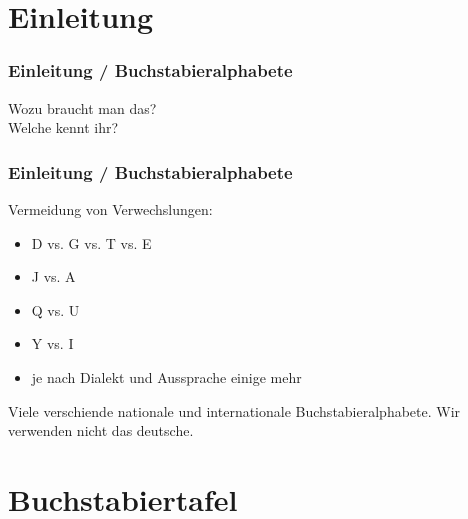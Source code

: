 

\subtitle{Betriebstechnik/Vorschriften 02:         \\
          Das ``Internationale Buchstabieralphabet'' \\[2em]}
\date{Stand 20.10.2016}



\section*{Einleitung}

\begin{frame}
    \frametitle{Einleitung / Buchstabieralphabete}
    \begin{center}
        \Large{Wozu braucht man das?} \\
        \Large{Welche kennt ihr?}
    \end{center}
\end{frame}

\begin{frame}
    \frametitle{Einleitung / Buchstabieralphabete}

    Vermeidung von Verwechslungen:

    \begin{itemize}
        \item D vs. G vs. T vs. E
        \item J vs. A
        \item Q vs. U
        \item Y vs. I
        \item je nach Dialekt und Aussprache einige mehr
    \end{itemize}

    Viele verschiende nationale und internationale Buchstabieralphabete. Wir
    verwenden nicht das deutsche.

\end{frame}

\section*{Buch\-stabier\-tafel}


